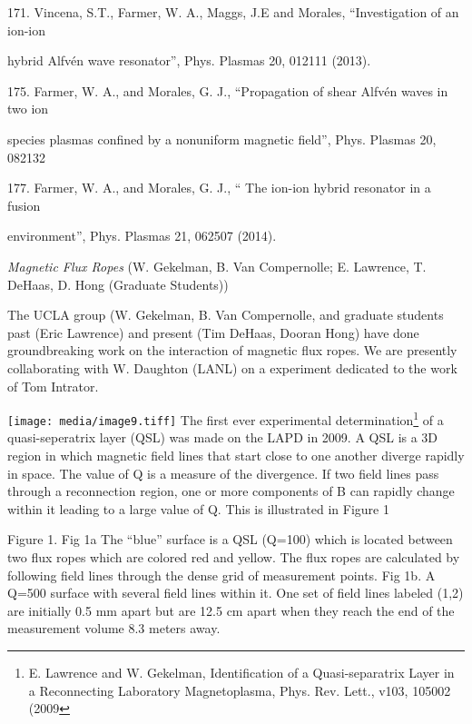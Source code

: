 \documentclass[11pt]{article}
\begin{document}
\begin{description}
171. Vincena, S.T., Farmer, W. A., Maggs, J.E and Morales,
``Investigation of an ion-ion

hybrid Alfvén wave resonator'', Phys. Plasmas 20, 012111 (2013).

175. Farmer, W. A., and Morales, G. J., ``Propagation of shear Alfvén
waves in two ion

species plasmas confined by a nonuniform magnetic field'', Phys. Plasmas
20, 082132

177. Farmer, W. A., and Morales, G. J., `` The ion-ion hybrid resonator
in a fusion

environment'', Phys. Plasmas 21, 062507 (2014).


\emph{Magnetic Flux Ropes} (W. Gekelman, B. Van Compernolle; E.
Lawrence, T. DeHaas, D. Hong (Graduate Students))

The UCLA group (W. Gekelman, B. Van Compernolle, and graduate students
past (Eric Lawrence) and present (Tim DeHaas, Dooran Hong) have done
groundbreaking work on the interaction of magnetic flux ropes. We are
presently collaborating with W. Daughton (LANL) on a experiment
dedicated to the work of Tom Intrator.

\texttt{[image: media/image9.tiff]} The first ever experimental
determination\footnote{E. Lawrence and W. Gekelman, Identification of a
  Quasi-separatrix Layer in a Reconnecting Laboratory Magnetoplasma,
  Phys. Rev. Lett., v103, 105002 (2009} of a quasi-seperatrix layer
(QSL) was made on the LAPD in 2009. A QSL is a 3D region in which
magnetic field lines that start close to one another diverge rapidly in
space. The value of Q is a measure of the divergence. If two field lines
pass through a reconnection region, one or more components of B can
rapidly change within it leading to a large value of Q. This is
illustrated in Figure 1

Figure 1. Fig 1a The ``blue'' surface is a QSL (Q=100) which is located
between two flux ropes which are colored red and yellow. The flux ropes
are calculated by following field lines through the dense grid of
measurement points. Fig 1b. A Q=500 surface with several field lines
within it. One set of field lines labeled (1,2) are initially 0.5 mm
apart but are 12.5 cm apart when they reach the end of the measurement
volume 8.3 meters away.


\end{description}
\end{document}
